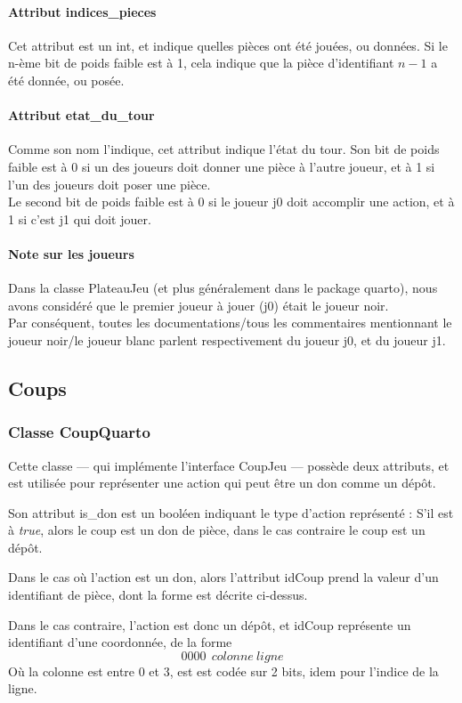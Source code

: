 \documentclass{article}
\begin{document}
\paragraph{Attribut indices\_pieces}
Cet attribut est un int, et indique quelles pièces ont été jouées, ou données.
Si le n-ème bit de poids faible est à 1, cela indique que la pièce
d'identifiant \(n-1\) a été donnée, ou posée.

\paragraph{Attribut etat\_du\_tour}
Comme son nom l'indique, cet attribut indique l'état du tour.
Son bit de poids faible est à 0 si un des joueurs doit donner une
pièce à l'autre joueur, et à 1 si l'un des joueurs doit poser une
pièce.\\
Le second bit de poids faible est à 0 si le joueur j0 doit accomplir
une action, et à 1 si c'est j1 qui doit jouer.


\paragraph{Note sur les joueurs}
Dans la classe PlateauJeu (et plus généralement dans le package
quarto), nous avons considéré que le premier joueur à jouer (j0) était
le joueur noir. \\
Par conséquent, toutes les documentations/tous les
commentaires mentionnant le joueur noir/le joueur blanc parlent
respectivement du joueur j0, et du joueur j1.

\subsection{Coups}
\subsubsection{Classe CoupQuarto}
Cette classe --- qui implémente l'interface CoupJeu ---
possède deux attributs, et est utilisée pour représenter
une action qui peut être un don comme un dépôt.

Son attribut is\_don est un booléen indiquant le type d'action
représenté : S'il est à \emph{true}, alors le coup est un don de
pièce, dans le cas contraire le coup est un dépôt.

Dans le cas o\`u l'action est un don, alors l'attribut idCoup prend la 
valeur d'un identifiant de pièce, dont la forme est décrite
ci-dessus. 

Dans le cas contraire, l'action est donc un dépôt, et idCoup
représente un identifiant d'une coordonnée, de la forme
\[ 0000~~colonne~ligne\]
O\`u la colonne est entre 0 et 3, est est codée sur 2 bits, idem pour
l'indice de la ligne.
\end{document}
